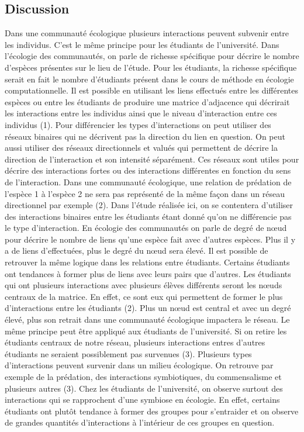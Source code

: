 \documentclass[9pt,twocolumn,twoside,]{pnas-new}
\begin{document}

\hypertarget{Discussion}{%
\subsection*{Discussion}\label{Discussion}}

Dans une communauté écologique plusieurs interactions peuvent subvenir
entre les individus. C'est le même principe pour les étudiants de
l'université. Dans l'écologie des communautés, on parle de richesse
spécifique pour décrire le nombre d'espèces présentes sur le lieu de
l'étude. Pour les étudiants, la richesse spécifique serait en fait le
nombre d'étudiants présent dans le cours de méthode en écologie
computationnelle. Il est possible en utilisant les liens effectués entre
les différentes espèces ou entre les étudiants de produire une matrice
d'adjacence qui décrirait les interactions entre les individus ainsi que
le niveau d'interaction entre ces individus (1). Pour différencier les
types d'interactions on peut utiliser des réseaux binaires qui ne
décrivent pas la direction du lien en question. On peut aussi utiliser
des réseaux directionnels et valués qui permettent de décrire la
direction de l'interaction et son intensité séparément. Ces réseaux sont
utiles pour décrire des interactions fortes ou des interactions
différentes en fonction du sens de l'interaction. Dans une communauté
écologique, une relation de prédation de l'espèce 1 à l'espèce 2 ne sera
pas représenté de la même façon dans un réseau directionnel par exemple
(2). Dans l'étude réalisée ici, on se contentera d'utiliser des
interactions binaires entre les étudiants étant donné qu'on ne
différencie pas le type d'interaction. En écologie des communautés on
parle de degré de nœud pour décrire le nombre de liens qu'une espèce
fait avec d'autres espèces. Plus il y a de liens d'effectuées, plus le
degré du nœud sera élevé. Il est possible de retrouver la même logique
dans les relations entre étudiants. Certains étudiants ont tendances à
former plus de liens avec leurs pairs que d'autres. Les étudiants qui
ont plusieurs interactions avec plusieurs élèves différents seront les
nœuds centraux de la matrice. En effet, ce sont eux qui permettent de
former le plus d'interactions entre les étudiants (2). Plus un nœud est
central et avec un degré élevé, plus son retrait dans une communauté
écologique impactera le réseau. Le même principe peut être appliqué aux
étudiants de l'université. Si on retire les étudiants centraux de notre
réseau, plusieurs interactions entres d'autres étudiants ne seraient
possiblement pas survenues (3). Plusieurs types d'interactions peuvent
survenir dans un milieu écologique. On retrouve par exemple de la
prédation, des interactions symbiotiques, du commensalisme et plusieurs
autres (3). Chez les étudiants de l'université, on observe surtout des
interactions qui se rapprochent d'une symbiose en écologie. En effet,
certains étudiants ont plutôt tendance à former des groupes pour
s'entraider et on observe de grandes quantités d'interactions à
l'intérieur de ces groupes en question.
\end{document}
